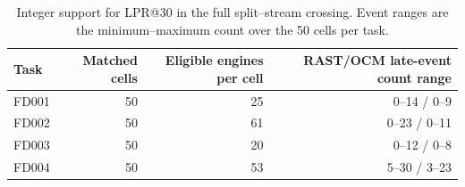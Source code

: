 \begin{table}[H]
\centering
\small
\caption{Integer support for LPR@30 in the full split--stream crossing. Event ranges are the minimum--maximum count over the 50 cells per task.}
\label{tab:full-crossing-lpr-support}
\begin{tabular}{@{}lrrr@{}}
\toprule
Task & Matched cells & Eligible engines per cell & RAST/OCM late-event count range \\
\midrule
FD001 & 50 & 25 & 0--14 / 0--9 \\
FD002 & 50 & 61 & 0--23 / 0--11 \\
FD003 & 50 & 20 & 0--12 / 0--8 \\
FD004 & 50 & 53 & 5--30 / 3--23 \\
\bottomrule
\end{tabular}
\end{table}
